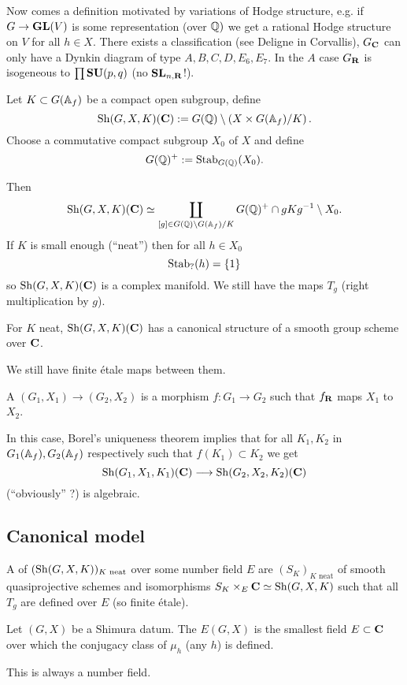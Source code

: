 Now comes a definition motivated by variations of Hodge structure, e.g. if $G\to \GL(V)$
is some representation (over $\mathbb Q)$ we get a rational Hodge structure on $V$ for all $h\in
X$. There exists a classification (see Deligne in Corvallis), $G_{\mathbf{C}}$ can only have a
Dynkin diagram of type $A,B,C,D,E_6,E_7$. In the $A$ case $G_{\mathbf{R}}$ is isogeneous to
$\prod \mathbf{SU}(p,q)$ (no $\mathbf{SL}_{n,\mathbf{R}}$!).

\begin{definition}
Let $K\subset G(\mathbb{A}_f)$ be a compact open subgroup, define
\[
\operatorname{Sh}(G,X,K)(\mathbf{C}) := G(\mathbb Q) \setminus \left( X\times G(\mathbb{A}_f) / K \right) .
\]
Choose a commutative compact subgroup $X_0$ of $X$ and define
\[
G(\mathbb Q)^{+} := \operatorname{Stab}_{G(\mathbb Q)}(X_0).
\]
\end{definition}
Then
\[
\operatorname{Sh}(G,X,K)(\mathbf{C}) \simeq \coprod_{[g]\in G(\mathbb Q)\setminus G(\mathbb{A}_f) / K}G(\mathbb Q)^{+}\cap
gKg^{-1}\setminus X_0.
\]
If $K$ is small enough (``neat'') then for all $h\in X_0$
\[
\operatorname{Stab}_{?}(h) = \{1\}
\]
so $\operatorname{Sh}(G,X,K)(\mathbf{C})$ is a complex manifold. We still have the maps $T_g$ (right
multiplication by $g$).
\begin{theorem}
For $K$ neat, $\operatorname{Sh}(G,X,K)(\mathbf{C})$ has a canonical structure of a smooth group scheme over $\mathbf{C}$.
\end{theorem}
We still have finite \'etale maps between them.
\begin{definition}
A  $(G_1,X_1)\to (G_2,X_2)$ is a morphism $f:G_1\to G_2$
such that $f_\mathbf{R}$ maps $X_1$ to $X_2$.
\end{definition}
In this case, Borel's uniqueness theorem implies that for all $K_1,K_2$ in $G_1(\mathbb{A}_f),
G_2(\mathbb{A}_f)$ respectively such that $f(K_1)\subset K_2$ we get
\[
\Sh(G_1,X_1,K_1)(\C) \to \Sh(G_2,X_2,K_2)(\C)
\]
(``obviously'' ?) is algebraic.

\subsection{Canonical model}
\begin{definition}
A  of $(\operatorname{Sh}(G,X,K))_{K\text{ neat}}$ over some number field $E$ are
$(S_K)_{K\text{ neat}}$ of smooth quasiprojective schemes and isomorphisms $S_K\times_E
\mathbf{C}\simeq \operatorname{Sh}(G,X,K)$ such that all $T_g$ are defined over $E$ (so finite \'etale).
\end{definition}
\begin{definition}
Let $(G,X)$ be a Shimura datum. The  $E(G,X)$ is the smallest field
$E\subset \mathbf{C}$ over which the conjugacy class of $\mu_h$ (any $h$) is defined.
\end{definition}
This is always a number field.


